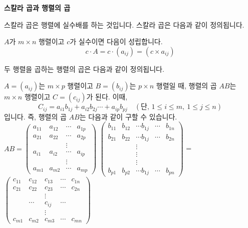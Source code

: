 \bigskip
\begin{flushleft}
    {\textcolor{subheader}{{\LARGE\textbf{스칼라 곱과 행렬의 곱}}}}
\end{flushleft}

\begin{flushleft}
    스칼라 곱은 행렬에 실수배를 하는 것입니다. 스칼라 곱은 다음과 같이 정의됩니다.
\end{flushleft}

\begin{tcolorbox}[colback = white, colframe = Definition, title = \textmd{정의: 스칼라 곱}]
    $A$가 $m \times n$ 행렬이고 $c$가 실수이면 다음이 성립합니다.
    $$ c \cdot A = c \cdot (a_{ij}) = (c \times a_{ij}) $$  
\end{tcolorbox}

\begin{flushleft}
    두 행렬을 곱하는 행렬의 곱은 다음과 같이 정의됩니다.
\end{flushleft}

\begin{tcolorbox}[colback = white, colframe = Definition, title = \textmd{정의: 행렬의 곱}]
    $A = (a_{ij})$는 $m \times p $ 행렬이고 $B = (b_{ij})$는 $p \times n$ 행렬일 때, 행렬의 곱 $AB$는 $m \times n $ 행렬이고 $C = (c_{ij})$가 된다. 이때, 
    \[ C_{ij} = a_{i1}b_{1j} + a_{i2}b_{2j} \cdots + a_{ip}b_{pj} \quad (\text{단, } 1 \leq i \leq m, \ 1 \leq j \leq n) \]
    입니다. 즉, 행렬의 곱 $AB$는 다음과 같이 구할 수 있습니다. \\

    $ AB = \begin{pmatrix} a_{11} & a_{12} & \cdots & a_{1p} \\  
    a_{21} & a_{22} & \cdots  & a_{2p}  \\ && \vdots  \\ 
    a_{i1} & a_{i2} & \cdots & a_{ip}
    \\  && \vdots   \\ 
    a_{m1} & a_{m2} & \cdots & a_{mp}\end{pmatrix} $
    $ \begin{pmatrix} b_{11} & b_{12} &  \cdots b_{1j} & \cdots & b_{1n} \\  
    b_{21} & b_{22} & \cdots b_{1j} & \cdots & b_{2n}  \\ && \vdots &&  \\ && \vdots &&  \\ && \vdots &&  \\
    b_{p1} & b_{p2} & \cdots b_{1j} & \cdots & b_{pn}\end{pmatrix} $
    =
    $ \begin{pmatrix} c_{11} & c_{12} & c_{13} & \cdots & c_{1n} \\  
    c_{21} & c_{22} & c_{23} & \cdots  & c_{2n}  \\ && \vdots &&  \\ 
    & \cdots & c_{ij} & \cdots 
    \\ && \vdots &&  \\ 
    c_{m1} & c_{m2} & c_{m3} & \cdots & c_{mn}\end{pmatrix} $
\end{tcolorbox}

